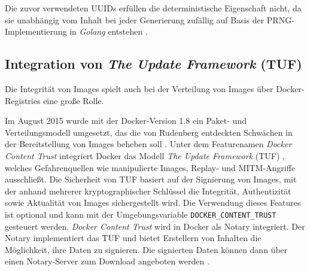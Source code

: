 \documentclass[../main.tex]{subfiles}
\begin{document}
      Die zuvor verwendeten UUIDs erfüllen die deterministische Eigenschaft nicht, da sie unabhängig vom Inhalt bei jeder Generierung zufällig auf Basis der \acrshort{PRNG}-Implementierung in \emph{Golang} entstehen \cite{githubImageUUID}.





      \clearpage

    \subsection{Integration von \emph{The Update Framework} (\acrshort{TUF})}
    \label{tuf}
      Die Integrität von Images spielt auch bei der Verteilung von Images über Docker-Registries eine große Rolle.

      Im August 2015 wurde mit der Docker-Version 1.8 ein Paket- und Verteilungsmodell umgesetzt, das die von Rudenberg entdeckten Schwächen in der Bereitstellung von Images beheben soll \cite{dockerContentTrust}. Unter dem Featurenamen \emph{Docker Content Trust} integriert Docker das Modell \emph{The Update Framework} (\acrshort{TUF}) \cite{tufFramework}, welches Gefahrenquellen wie manipulierte Images, Replay- und MITM-Angriffe ausschließt. Die Sicherheit von TUF basiert auf der Signierung von Images, mit der anhand mehrerer kryptographischer Schlüssel die Integrität, Authentizität sowie Aktualität von Images sichergestellt wird. Die Verwendung dieses Features ist optional und kann mit der Umgebungsvariable \texttt{DOCKER\_CONTENT\_TRUST} gesteuert werden. \emph{Docker Content Trust} wird in Docker als Notary integriert. Der Notary implementiert das TUF und bietet Erstellern von Inhalten die Möglichkeit, ihre Daten zu signieren. Die signierten Daten können dann über einen Notary-Server zum Download angeboten werden \cite{githubNotary}\cite{dockerContentTrust}.
\end{document}
